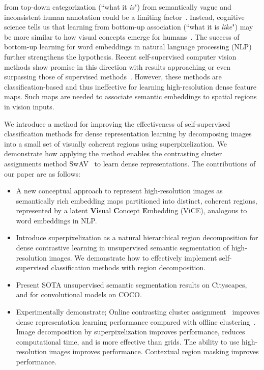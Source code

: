 \documentclass{bmvc2k}
\begin{document}
\noindent
from top-down categorization (``what it \textit{is}") from semantically vague and inconsistent human annotation could be a limiting factor~\cite{Efros2021SSLBottomUP}. Instead, cognitive science tells us that learning from bottom-up association (``what it is \textit{like}") may be more similar to how visual concepts emerge for humans~\cite{Rosch1973NatCat,Medin1978ContextTheory,Nosofsky1986AttSimIdCatRel,Nosofsky1992ExemplarConnectionistLearning}. The success of bottom-up learning for word embeddings in natural language processing (NLP)~\cite{Harris1954DistributionalHypothesis,Mikolov2013EffWordRep,Mikolov2013DistributedRO} further strengthens the hypothesis. Recent self-supervised computer vision methods show promise in this direction with results approaching or even surpassing those of supervised methods~\cite{Goyal2021SEER}. However, these methods are classification-based and thus ineffective for learning high-resolution dense feature maps. Such maps are needed to associate semantic embeddings to spatial regions in vision inputs.

We introduce a method for improving the effectiveness of self-supervised classification methods for dense representation learning by decomposing images into a small set of visually coherent regions using superpixelization. We demonstrate how applying the method enables the contrasting cluster assignments method SwAV~\cite{Caron2020SwAV} to learn dense representations.
The contributions of our paper are as follows:
\begin{itemize}
    \setlength\itemsep{-0.5em}
    \item{A new conceptual approach to represent high-resolution images as semantically rich embedding maps partitioned into distinct, coherent regions, represented by a latent \textbf{Vi}sual \textbf{C}oncept \textbf{E}mbedding (ViCE), analogous to word embeddings in NLP.}
    \item {Introduce superpixelization as a natural hierarchical region decomposition for dense contrastive learning in unsupervised semantic segmentation of high-resolution images. We demonstrate how to effectively implement self-supervised classification methods with region decomposition.}
    \item{Present SOTA unsupervised semantic segmentation results on Cityscapes, and for convolutional models on COCO.}
    \item{Experimentally demonstrate; Online contrasting cluster assignment~\cite{Caron2020SwAV} improves dense representation learning performance compared with offline clustering~\cite{Caron2018DeepCluster, Cho2021PiCIE}. Image decomposition by superpixelization improves performance, reduces computational time, and is more effective than grids. The ability to use high-resolution images improves performance. Contextual region masking improves performance.}
    
\end{itemize}
\end{document}
